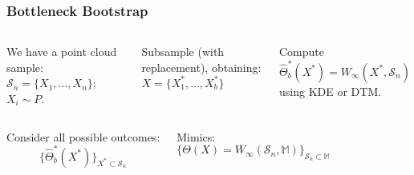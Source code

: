 \begin{frame}
    \frametitle{Bottleneck Bootstrap}

    \begin{columns}

        \begin{block}{}
            We have a point cloud sample: $\mathcal{S}_n = \{ X_1, \ldots, X_n\}$; $X_i \sim P$.
        \end{block}

        \pause

        \begin{block}{}
            Subsample (with replacement), obtaining:
            $X = \{ X_1^*, \ldots, X_b^*\}$
        \end{block}

        \pause

        \begin{block}{}
            Compute
            $\hat{\Theta}_b^*(X^*) =
            W_{\infty}(X^*,\mathcal{S}_n)$ using KDE or DTM.
        \end{block}

        \centering

    \end{columns}

    \pause
    \begin{columns}
        \begin{block}{}
            Consider all possible outcomes:
            $$ \{ \hat{\Theta}_{b}^*(X^*) \}_{X^* \subset \mathcal{S}_n}$$
        \end{block}

        \pause
        \begin{block}{}
            Mimics:
            $$ \{ {\Theta}(X) = W_{\infty}(\mathcal{S}_n,\mathbb{M}) \}_{\mathcal{S}_n
            \subset \mathbb{M}}$$
        \end{block}
    \end{columns}
\end{frame}



